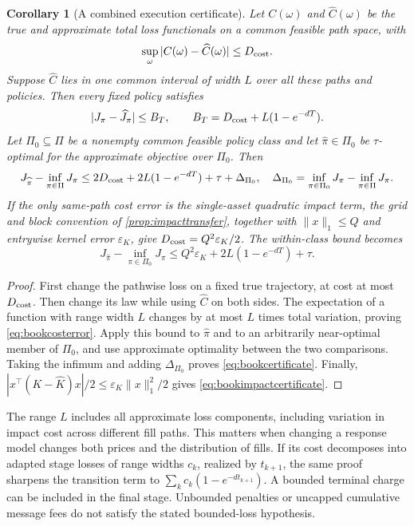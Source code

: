 \documentclass[11pt]{article}
\numberwithin{equation}{section}
\newtheorem{corollary}[theorem]{Corollary}
\theoremstyle{definition}
\theoremstyle{remark}
\theoremstyle{definition}
\begin{document}
\begin{corollary}[A combined execution certificate]\label{cor:bookcertificate}
Let $C(\omega)$ and $\widehat C(\omega)$ be the true and approximate total
loss functionals on a common feasible path space, with
\[
 \sup_\omega|C(\omega)-\widehat C(\omega)|\le D_{\rm cost}.
\]
Suppose $\widehat C$ lies in one common interval of width $L$ over all these
paths and policies. Then every fixed policy satisfies
\begin{equation}\label{eq:bookcosterror}
 |J_\pi-\widehat J_\pi|\le B_T,
 \qquad B_T=D_{\rm cost}+L(1-e^{-dT}).
\end{equation}
Let $\Pi_0\subseteq\Pi$ be a nonempty common feasible policy class and
let $\widehat\pi\in\Pi_0$ be $\tau$-optimal for the approximate objective
over $\Pi_0$. Then
\begin{equation}\label{eq:bookcertificate}
 J_{\widehat\pi}-\inf_{\pi\in\Pi}J_\pi
 \le 2D_{\rm cost}+2L(1-e^{-dT})+\tau+\Delta_{\Pi_0},
 \quad
 \Delta_{\Pi_0}=\inf_{\pi\in\Pi_0}J_\pi-\inf_{\pi\in\Pi}J_\pi.
\end{equation}
If the only same-path cost error is the single-asset quadratic impact term,
the grid and block convention of \cref{prop:impacttransfer}, together with
$\lVert x\rVert_1\le Q$ and entrywise kernel error $\varepsilon_K$, give
$D_{\rm cost}=Q^2\varepsilon_K/2$. The within-class bound becomes
\begin{equation}\label{eq:bookimpactcertificate}
 J_{\widehat\pi}-\inf_{\pi\in\Pi_0}J_\pi
 \le Q^2\varepsilon_K+2L(1-e^{-dT})+\tau.
\end{equation}
\end{corollary}
\begin{proof}
First change the pathwise loss on a fixed true trajectory, at cost at most
$D_{\rm cost}$. Then change its law while using $\widehat C$ on both sides.
The expectation of a function with range width $L$ changes by at most $L$
times total variation, proving \eqref{eq:bookcosterror}. Apply this bound to
$\widehat\pi$ and to an arbitrarily near-optimal member of $\Pi_0$, and
use approximate optimality between the two comparisons. Taking the infimum
and adding $\Delta_{\Pi_0}$ proves \eqref{eq:bookcertificate}. Finally,
$|x^\top(K-\widehat K)x|/2\le\varepsilon_K\lVert x\rVert_1^2/2$
gives \eqref{eq:bookimpactcertificate}.
\end{proof}

The range $L$ includes all approximate loss components, including variation
in impact cost across different fill paths. This matters when changing a
response model changes both prices and the distribution of fills. If its
cost decomposes into adapted stage losses of range widths $c_k$, realized by
$t_{k+1}$, the same proof sharpens the transition term to
$\sum_k c_k(1-e^{-dt_{k+1}})$. A bounded terminal charge can be included
in the final stage. Unbounded penalties or uncapped cumulative message fees
do not satisfy the stated bounded-loss hypothesis.
\end{document}
